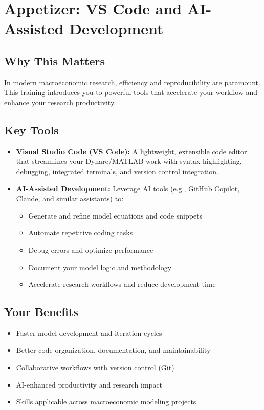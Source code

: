 \documentclass[11pt]{article}
\begin{document}
\section*{Appetizer: VS Code and AI-Assisted Development}

\subsection*{Why This Matters}

In modern macroeconomic research, efficiency and reproducibility are paramount. This training introduces you to powerful tools that accelerate your workflow and enhance your research productivity.

\subsection*{Key Tools}

\begin{itemize}
    \item \textbf{Visual Studio Code (VS Code):} A lightweight, extensible code editor that streamlines your Dynare/MATLAB work with syntax highlighting, debugging, integrated terminals, and version control integration.
    
    \item \textbf{AI-Assisted Development:} Leverage AI tools (e.g., GitHub Copilot, Claude, and similar assistants) to:
    \begin{itemize}
        \item Generate and refine model equations and code snippets
        \item Automate repetitive coding tasks
        \item Debug errors and optimize performance
        \item Document your model logic and methodology
        \item Accelerate research workflows and reduce development time
    \end{itemize}
\end{itemize}

\subsection*{Your Benefits}

\begin{itemize}
    \item Faster model development and iteration cycles
    \item Better code organization, documentation, and maintainability
    \item Collaborative workflows with version control (Git)
    \item AI-enhanced productivity and research impact
    \item Skills applicable across macroeconomic modeling projects
\end{itemize}
\end{document}
